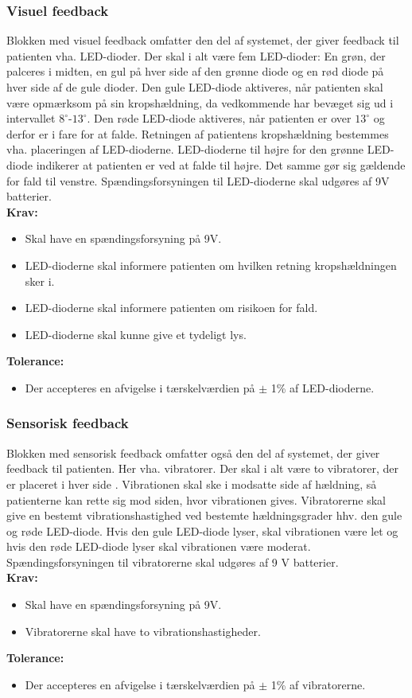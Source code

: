 \subsubsection{Visuel feedback}
Blokken med visuel feedback omfatter den del af systemet, der giver feedback til patienten vha. LED-dioder. Der skal i alt være fem LED-dioder: En grøn, der palceres i midten, en gul på hver side af den grønne diode og en rød diode på hver side af de gule dioder. Den gule LED-diode aktiveres, når patienten skal være opmærksom på sin kropshældning, da vedkommende har bevæget sig ud i intervallet $8^{\circ}$-$13^{\circ}$. Den røde LED-diode aktiveres, når patienten er over $13^{\circ}$ og derfor er i fare for at falde. Retningen af patientens kropshældning bestemmes vha. placeringen af LED-dioderne. LED-dioderne til højre for den grønne LED-diode indikerer at patienten er ved at falde til højre. Det samme gør sig gældende for fald til venstre. Spændingsforsyningen til LED-dioderne skal udgøres af 9V batterier.   
\\
\textbf{Krav:}
\begin{itemize}
\item Skal have en spændingsforsyning på 9V.
\item LED-dioderne skal informere patienten om hvilken retning kropshældningen sker i.
\item LED-dioderne skal informere patienten om risikoen for fald.
\item LED-dioderne skal kunne give et tydeligt lys.
\end{itemize}
\textbf{Tolerance:}
\begin{itemize}
\item Der accepteres en afvigelse i tærskelværdien på $\pm$ 1\% af LED-dioderne.
\end{itemize}
\subsubsection{Sensorisk feedback} 
Blokken med sensorisk feedback omfatter også den del af systemet, der giver feedback til patienten. Her vha. vibratorer. Der skal i alt være to vibratorer, der er placeret i hver side . Vibrationen skal ske i modsatte side af hældning, så patienterne kan rette sig mod siden, hvor vibrationen gives. Vibratorerne skal give en bestemt vibrationshastighed ved bestemte hældningsgrader hhv. den gule og røde LED-diode. Hvis den gule LED-diode lyser, skal vibrationen være let og hvis den røde LED-diode lyser skal vibrationen være moderat. Spændingsforsyningen til vibratorerne skal udgøres af 9 V batterier.
\\
\textbf{Krav:}
\begin{itemize}
\item Skal have en spændingsforsyning på 9V.
\item Vibratorerne skal have to vibrationshastigheder.
\end{itemize}
\textbf{Tolerance:}
\begin{itemize}
\item Der accepteres en afvigelse i tærskelværdien på $\pm$ 1\% af vibratorerne.
\end{itemize}


